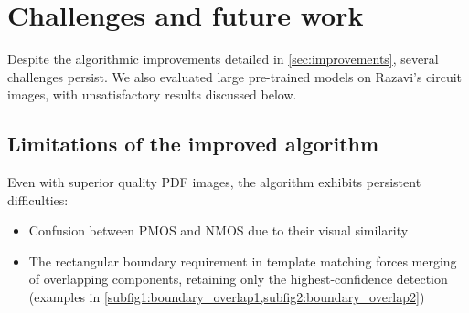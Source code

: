 \documentclass{article}
\begin{document}
\section{Challenges and future work}\label{sec:challenges}

Despite the algorithmic improvements detailed in \cref{sec:improvements}, several challenges persist. 
We also evaluated large pre-trained models on Razavi's circuit images, with unsatisfactory results discussed below.

\subsection{Limitations of the improved algorithm}

Even with superior quality PDF images, the algorithm exhibits persistent difficulties:
\begin{itemize}
\item Confusion between PMOS and NMOS due to their visual similarity
\item The rectangular boundary requirement in template matching forces merging of overlapping components, retaining only the highest-confidence detection 
(examples in \cref{subfig1:boundary_overlap1,subfig2:boundary_overlap2})
\end{itemize}
\end{document}
